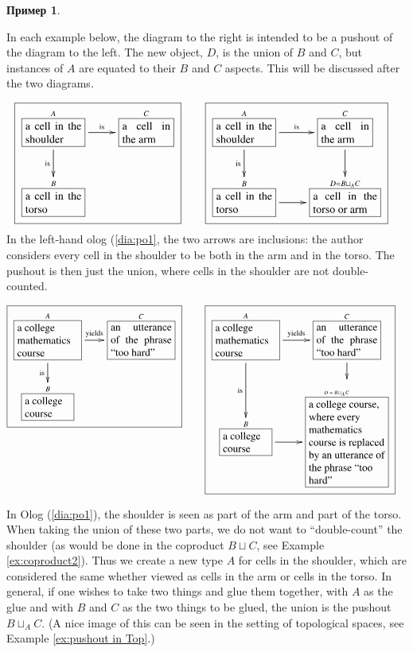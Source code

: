\documentclass[a4paper]{book}
\def\tn{\textnormal}
\def\hsp{\hspace{.3in}}
\def\rr{\raggedright}
\newcommand{\LA}[2]{\ar[#1]^-{\tn {#2}}}
\newcommand{\LAL}[2]{\ar[#1]_-{\tn {#2}}}
\newcommand{\obox}[3]{\stackrel{#1}{\fbox{\parbox{#2}{#3}}}}
\theoremstyle{myth}
\newtheorem{exampleENG}[envENG]{\begin{english}Example\end{english}}
\newtheorem{exampleRUS}[envRUS]{Пример}
\begin{document}
\begin{russian}
\begin{exampleRUS}
\end{exampleRUS}

\begin{exampleENG}[Pushout]\label{ex:pushout}
In each example below, the diagram to the right is intended to be a pushout of the diagram to the left.  The new object, $D$, is the union of $B$ and $C$, but instances of $A$ are equated to their $B$ and $C$ aspects.  This will be discussed after the two diagrams.

\begin{align}
\label{dia:po1}\fbox{\xymatrixnocompile{\obox{A}{.7in}{a cell in the shoulder}\LA{r}{is}\LAL{d}{is}&\obox{C}{.6in}{a cell in the arm}\\\obox{B}{.7in}{a cell in the torso}}}\hsp&\fbox{\xymatrix{\obox{A}{.7in}{a cell in the shoulder}\LA{r}{is}\LAL{d}{is}&\obox{C}{.6in}{a cell in the arm}\LA{d}{}\\\obox{B}{.7in}{a cell in the torso}\LA{r}{}&\obox{D=B\sqcup_AC}{.8in}{a cell in the torso or arm}}}
\end{align}
In the left-hand olog (\ref{dia:po1}, the two arrows are inclusions: the author considers every cell in the shoulder to be both in the arm and in the torso. The pushout is then just the union, where cells in the shoulder are not double-counted.

\begin{align}\label{dia:po2}\fbox{\xymatrixnocompile@=18pt{\obox{A}{.8in}{\rr a college mathematics course}\LA{r}{yields}\LAL{d}{is}&\obox{C}{.8in}{an utterance of the phrase “too hard”}\\\obox{B}{.6in}{\rr a college course}}}\hsp&\fbox{\xymatrixnocompile@=18pt{\obox{A}{.8in}{\rr a college mathematics course}\LA{r}{yields}\LAL{d}{is}&\obox{C}{.8in}{an utterance of the phrase “too hard”}\LA{d}{}\\\obox{B}{.6in}{\rr a college course}\LA{r}{}&\obox{\parbox{.6in}{\vspace{.1in}\tiny$D=B\!\sqcup_A\!C$}}{1in}{\rr a college course, where every mathematics course is replaced by an utterance of the phrase “too hard”}}}
\end{align}

In Olog (\ref{dia:po1}), the shoulder is seen as part of the arm and part of the torso.  When taking the union of these two parts, we do not want to “double-count” the shoulder (as would be done in the coproduct $B\sqcup C$, see Example \ref{ex:coproduct2}).  Thus we create a new type $A$ for cells in the shoulder, which are considered the same whether viewed as cells in the arm or cells in the torso.  In general, if one wishes to take two things and glue them together, with $A$ as the glue and with $B$ and $C$ as the two things to be glued, the union is the pushout $B\sqcup_AC$. (A nice image of this can be seen in the setting of topological spaces, see Example \ref{ex:pushout in Top}.)


\end{exampleENG}
\end{russian}
\end{document}
